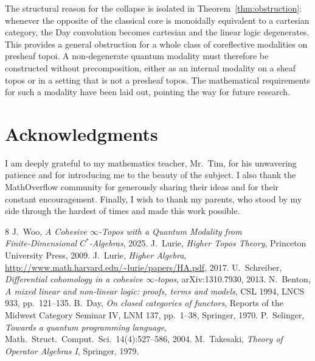 \documentclass[12pt,a4paper]{article}
\theoremstyle{plain}
\theoremstyle{definition}
\begin{document}
The structural reason for the collapse is isolated in Theorem~\ref{thm:obstruction}: whenever the opposite of the classical core is monoidally equivalent to a cartesian category, the Day convolution becomes cartesian and the linear logic degenerates.  This provides a general obstruction for a whole class of coreflective modalities on presheaf topoi.  A non‑degenerate quantum modality must therefore be constructed without precomposition, either as an internal modality on a sheaf topos or in a setting that is not a presheaf topos.  The mathematical requirements for such a modality have been laid out, pointing the way for future research.

\section*{Acknowledgments}
I am deeply grateful to my mathematics teacher, Mr.~Tim, for his unwavering patience and for introducing me to the beauty of the subject.  I also thank the MathOverflow community for generously sharing their ideas and for their constant encouragement.  Finally, I wish to thank my parents, who stood by my side through the hardest of times and made this work possible.

\begin{thebibliography}{8}
 J.~Woo, \emph{A Cohesive \(\infty\)-Topos with a Quantum Modality from Finite‑Dimensional \(C^{*}\)-Algebras}, 2025.
 J.~Lurie, \emph{Higher Topos Theory}, Princeton University Press, 2009.
 J.~Lurie, \emph{Higher Algebra}, \url{http://www.math.harvard.edu/~lurie/papers/HA.pdf}, 2017.
 U.~Schreiber, \emph{Differential cohomology in a cohesive \(\infty\)-topos}, arXiv:1310.7930, 2013.
 N.~Benton, \emph{A mixed linear and non‑linear logic: proofs, terms and models}, CSL 1994, LNCS 933, pp.~121--135.
 B.~Day, \emph{On closed categories of functors}, Reports of the Midwest Category Seminar IV, LNM 137, pp.~1--38, Springer, 1970.
 P.~Selinger, \emph{Towards a quantum programming language}, Math.\ Struct.\ Comput.\ Sci.\ 14(4):527--586, 2004.
 M.~Takesaki, \emph{Theory of Operator Algebras I}, Springer, 1979.
\end{thebibliography}
\end{document}
